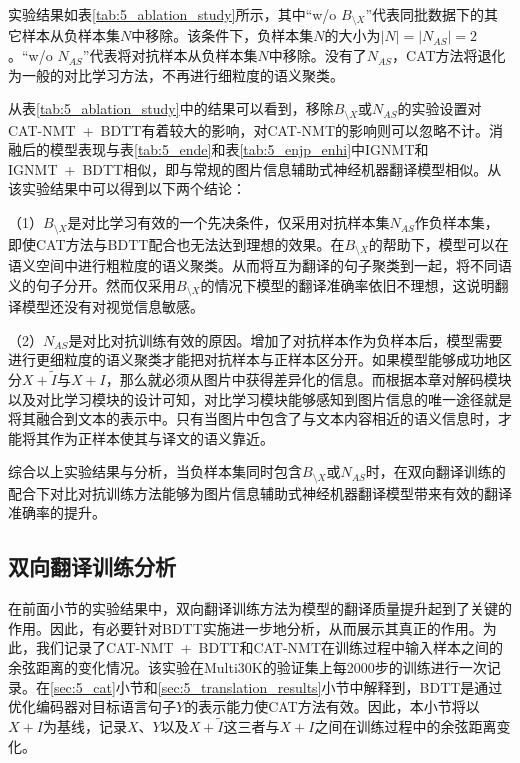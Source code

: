 实验结果如表\ref{tab:5_ablation_study}所示，其中“w/o $B_{\setminus X}$”代表同批数据下的其它样本从负样本集$N$中移除。该条件下，负样本集$N$的大小为$|N|=|N_{AS}|=2$。“w/o $N_{AS}$”代表将对抗样本从负样本集$N$中移除。没有了$N_{AS}$，CAT方法将退化为一般的对比学习方法，不再进行细粒度的语义聚类。

从表\ref{tab:5_ablation_study}中的结果可以看到，移除$B_{\setminus X}$或$N_{AS}$的实验设置对CAT-NMT~+~BDTT有着较大的影响，对CAT-NMT的影响则可以忽略不计。消融后的模型表现与表\ref{tab:5_ende}和表\ref{tab:5_enjp_enhi}中IGNMT和IGNMT~+~BDTT相似，即与常规的图片信息辅助式神经机器翻译模型相似。从该实验结果中可以得到以下两个结论：

（1）$B_{\setminus X}$是对比学习有效的一个先决条件，仅采用对抗样本集$N_{AS}$作负样本集，即使CAT方法与BDTT配合也无法达到理想的效果。在$B_{\setminus X}$的帮助下，模型可以在语义空间中进行粗粒度的语义聚类。从而将互为翻译的句子聚类到一起，将不同语义的句子分开。然而仅采用$B_{\setminus X}$的情况下模型的翻译准确率依旧不理想，这说明翻译模型还没有对视觉信息敏感。

（2）$N_{AS}$是对比对抗训练有效的原因。增加了对抗样本作为负样本后，模型需要进行更细粒度的语义聚类才能把对抗样本与正样本区分开。如果模型能够成功地区分$X+\tilde{I}$与$X+I$，那么就必须从图片中获得差异化的信息。而根据本章对解码模块以及对比学习模块的设计可知，对比学习模块能够感知到图片信息的唯一途径就是将其融合到文本的表示中。只有当图片中包含了与文本内容相近的语义信息时，才能将其作为正样本使其与译文的语义靠近。

综合以上实验结果与分析，当负样本集同时包含$B_{\setminus X}$或$N_{AS}$时，在双向翻译训练的配合下对比对抗训练方法能够为图片信息辅助式神经机器翻译模型带来有效的翻译准确率的提升。

\subsection{双向翻译训练分析}
\label{sec:5_bdtt_analysis}

在前面小节的实验结果中，双向翻译训练方法为模型的翻译质量提升起到了关键的作用。因此，有必要针对BDTT实施进一步地分析，从而展示其真正的作用。为此，我们记录了CAT-NMT~+~BDTT和CAT-NMT在训练过程中输入样本之间的余弦距离的变化情况。该实验在Multi30K的验证集上每2000步的训练进行一次记录。在\ref{sec:5_cat}小节和\ref{sec:5_translation_results}小节中解释到，BDTT是通过优化编码器对目标语言句子$Y$的表示能力使CAT方法有效。因此，本小节将以$X+I$为基线，记录$X$、$Y$以及$X+\tilde{I}$这三者与$X+I$之间在训练过程中的余弦距离变化。


